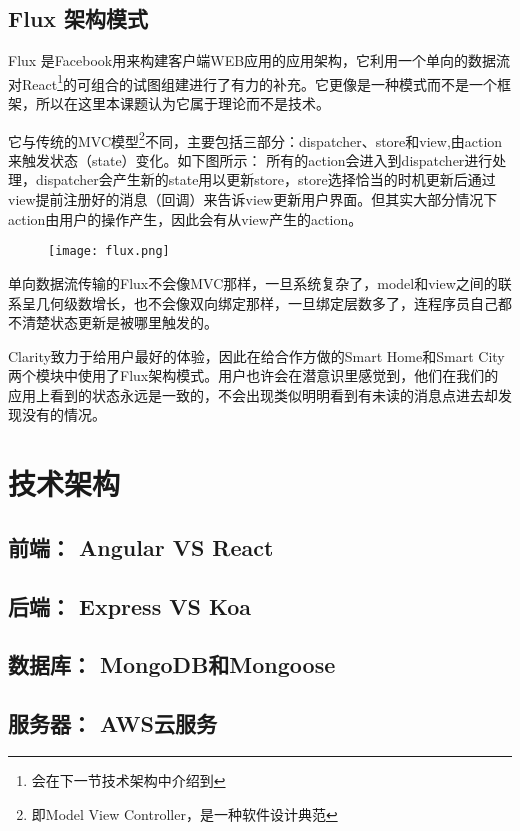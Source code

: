 \subsection{Flux 架构模式}
Flux 是Facebook用来构建客户端WEB应用的应用架构，它利用一个单向的数据流对React\footnote{会在下一节技术架构中介绍到}的可组合的试图组建进行了有力的补充。它更像是一种模式而不是一个框架，所以在这里本课题认为它属于理论而不是技术。

它与传统的MVC模型\footnote{即Model View Controller，是一种软件设计典范}不同，主要包括三部分：dispatcher、store和view,由action来触发状态（state）变化。如下图所示： 所有的action会进入到dispatcher进行处理，dispatcher会产生新的state用以更新store，store选择恰当的时机更新后通过view提前注册好的消息（回调）来告诉view更新用户界面。但其实大部分情况下action由用户的操作产生，因此会有从view产生的action。

\begin{figure}[!htp]
 \centering
 \texttt{[image: flux.png]}
\end{figure}

单向数据流传输的Flux不会像MVC那样，一旦系统复杂了，model和view之间的联系呈几何级数增长，也不会像双向绑定那样，一旦绑定层数多了，连程序员自己都不清楚状态更新是被哪里触发的。

Clarity致力于给用户最好的体验，因此在给合作方做的Smart Home和Smart City两个模块中使用了Flux架构模式。用户也许会在潜意识里感觉到，他们在我们的应用上看到的状态永远是一致的，不会出现类似明明看到有未读的消息点进去却发现没有的情况。

\section{技术架构}
\subsection{前端： Angular VS React}
\subsection{后端： Express VS Koa}
\subsection{数据库： MongoDB和Mongoose}
\subsection{服务器： AWS云服务}

